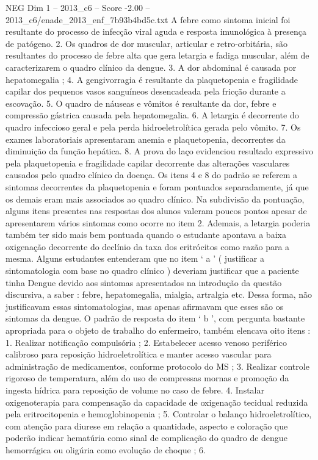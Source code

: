 \begin{textsample}{NEG Dim 1 – 2013\_c6 – Score -2.00 – 2013\_c6/enade\_2013\_enf\_7b93b4bd5c.txt}
A febre como sintoma inicial foi resultante do processo de infecção viral aguda e resposta imunológica à presença de patógeno. 2.
Os quadros de dor muscular, articular e retro-orbitária, são resultantes do processo de febre alta que gera letargia e fadiga muscular, além de caracterizarem o quadro clínico da dengue. 3.
A dor abdominal é causada por hepatomegalia ; 4.
A gengivorragia é resultante da plaquetopenia e fragilidade capilar dos pequenos vasos sanguíneos desencadeada pela fricção durante a escovação. 5.
O quadro de náuseas e vômitos é resultante da dor, febre e compressão gástrica causada pela hepatomegalia. 6.
A letargia é decorrente do quadro infeccioso geral e pela perda hidroeletrolítica gerada pelo vômito. 7.
Os exames laboratoriais apresentaram anemia e plaquetopenia, decorrentes da diminuição da função hepática. 8.
A prova do laço evidenciou resultado expressivo pela plaquetopenia e fragilidade capilar decorrente das alterações vasculares causados pelo quadro clínico da doença.
Os itens 4 e 8 do padrão se referem a sintomas decorrentes da plaquetopenia e foram pontuados separadamente, já que os demais eram mais associados ao quadro clínico.
Na subdivisão da pontuação, alguns itens presentes nas respostas dos alunos valeram poucos pontos apesar de apresentarem vários sintomas como ocorre no item 2.
Ademais, a letargia poderia também ter sido mais bem pontuada quando o estudante apontava a baixa oxigenação decorrente do declínio da taxa dos eritrócitos como razão para a mesma.
Alguns estudantes entenderam que no item ‘ a ’ ( justificar a sintomatologia com base no quadro clínico ) deveriam justificar que a paciente tinha Dengue devido aos sintomas apresentados na introdução da questão discursiva, a saber : febre, hepatomegalia, mialgia, artralgia etc.
Dessa forma, não justificavam essas sintomatologias, mas apenas afirmavam que esses são os sintomas da dengue.
O padrão de resposta do item ‘ b ’, com pergunta bastante apropriada para o objeto de trabalho do enfermeiro, também elencava oito itens : 1.
Realizar notificação compulsória ; 2.
Estabelecer acesso venoso periférico calibroso para reposição hidroeletrolítica e manter acesso vascular para administração de medicamentos, conforme protocolo do MS ; 3.
Realizar controle rigoroso de temperatura, além do uso de compressas mornas e promoção da ingesta hídrica para reposição de volume no caso de febre. 4.
Instalar oxigenoterapia para compensação da capacidade de oxigenação tecidual reduzida pela eritrocitopenia e hemoglobinopenia ; 5.
Controlar o balanço hidroeletrolítico, com atenção para diurese em relação a quantidade, aspecto e coloração que poderão indicar hematúria como sinal de complicação do quadro de dengue hemorrágica ou oligúria como evolução de choque ; 6.

\end{textsample}
